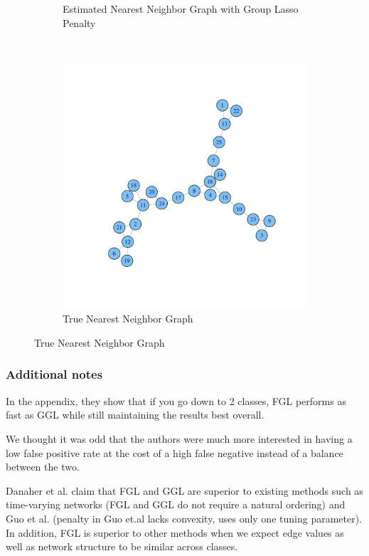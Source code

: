 \documentclass[t]{beamer}
\begin{document}
\begin{frame}
\begin{figure}
\begin{subfigure}[b]{0.40\textwidth}
  \caption{Estimated Nearest Neighbor Graph with Group Lasso Penalty}
\label{fig:nearestgaphsestimate}
\end{subfigure}\\
\begin{subfigure}[b]{0.50\textwidth}
  \includegraphics [scale=0.15]{Omega3-f.pdf}
  \caption{True Nearest Neighbor Graph}
\label{fig:nearestgaphsactual}
\end{subfigure}
\end{figure}
\end{frame}

\begin{frame}
\frametitle{Additional notes}
In the appendix, they show that if you go down to 2 classes, FGL performs as fast as GGL while still maintaining the results best overall.

\bigskip
\pause
We thought it was odd that the authors were much more interested in having  a low false positive rate at the cost of a high false negative instead of a balance between the two. 

\bigskip
\pause
Danaher et al. claim that FGL and GGL are superior to existing methods such as time-varying networks (FGL and GGL do not require a natural ordering) and Guo et al. (penalty in Guo et.al lacks convexity, uses only one tuning parameter). In addition, FGL is superior to other methods when we expect edge values as well as network structure to be similar across classes. 

\end{frame}

%

%        
%        
%
\end{document}
